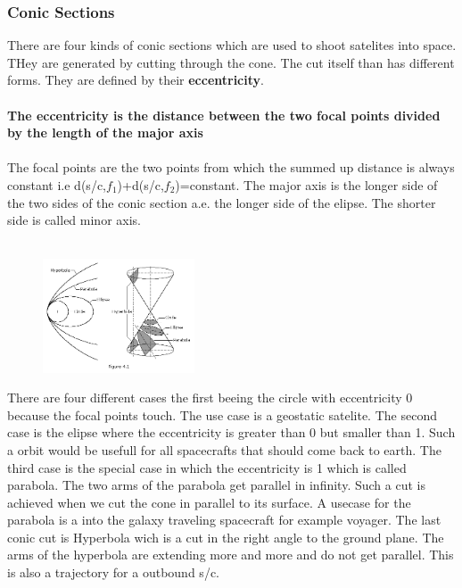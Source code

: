 \subsubsection{Conic Sections}
There are four kinds of conic sections which are used to shoot satelites into space. THey are generated by cutting through the cone. The cut itself than has different forms. They are defined by their \textbf{eccentricity}.\\\\
\textbf{The eccentricity is the distance between the two focal points divided by the length of the major axis}\\
\\
The focal points are the two points from which the summed up distance is always constant i.e d(\ac{s/c},$f_1$)+d(\ac{s/c},$f_2$)=constant. The major axis is the longer side of the two sides of the conic section a.e. the longer side of the elipse. The shorter side is called minor axis.\\
\\
\begin{figure}
\centering
\includegraphics[width=0.4\textwidth]{images/Foliensatz2_conecut.png}
\end{figure}
There are four different cases the first beeing the circle with eccentricity 0 because the focal points touch. The use case is a geostatic satelite. The second case is the elipse where the eccentricity is greater than 0 but smaller than 1. Such a orbit would be usefull for all spacecrafts that should come back to earth. The third case is the special case in which the eccentricity is 1 which is called parabola. The two arms of the parabola get parallel in infinity. Such a cut is achieved when we cut the cone in parallel to its surface. A usecase for the parabola is a into the galaxy traveling spacecraft for example voyager. The last conic cut is Hyperbola wich is a cut in the right angle to the ground plane. The arms of the hyperbola are extending more and more and do not get parallel. This is also a trajectory for a outbound \ac{s/c}.

